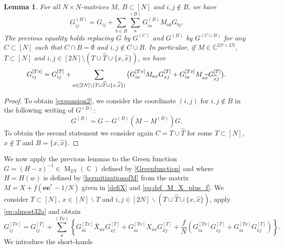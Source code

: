 \documentclass[10pt,a4paper]{amsart}
\DeclareMathOperator{\CC}{\mathbb{C}}
\DeclareMathOperator{\Mat}{\mathrm{M}}
\newcommand{\C}{\mathbb{C}}
\newtheorem{lemma}{Lemma}[section]
\numberwithin{equation}{section}
\newcommand*\barr[1]{\overline{#1}}
\newcommand*\bset[1]{[#1]}
\newcommand*\ubarr[1]{{\widehat{#1}}}
\newcommand{\nc}{\normalcolor}
\begin{document}
	\begin{lemma}
		For all $N \times N$-matrices $M$, $B \subset [N]$ and $i,j \notin B$, we have
		\begin{equation}\label{expansion2}
			G^{(B)}_{ij} = G_{ij} + \sum_{b \in B }\sum_{a}^{(B)}G^{(B)}_{ia}M_{ab}G_{bj}.
		\end{equation}
		The previous equality holds replacing $G$ by $G^{(C)}$ and $G^{(B)}$ by $G^{(C \cup B)}$ for any $C\subset [N]$ such that $C \cap B = \emptyset$ and $ i,j \notin C \cup B$. In particular, if $M \in \C^{2N\times 2N}$, $T \subset [N]$ and $i,j \in [2N]\setminus (T \cup \ubarr{T} \cup \{ x, \ubarr{x}\})$, 
		we have
		\begin{equation}\label{eq:almost32a}
			G^{\bset{Tx}}_{ij} = G_{ij}^{\bset{T}} + \sum_{ a \in [2N]\setminus (T \cup \ubarr{T} \cup \{ x, \ubarr{x}\})\nc} \big(  G_{ia}^{\bset{Tx}} M_{ax} G_{xj}^{\bset{T}} +  G_{ia}^{\bset{Tx}} M_{a\ubarr{x}} G_{\ubarr{x}j}^{\bset{T}}\big) .
		\end{equation}
		
	\end{lemma}
	\begin{proof}
		To obtain \eqref{expansion2}, we consider the coordinate $(i,j)$ for $i,j \notin B$ in the following writing of $G^{(B)}$:
		\begin{equation*}
			G^{(B)}= G - G^{(B)} \left(M - M^{(B)}\right) G.
		\end{equation*}
		To obtain the second statement we consider again  $C = T \cup \ubarr{T}$ for some $T \subset [N] $, $x \notin T$ and $B = \{x, \ubarr{x}\}$.
	\end{proof}
	We now apply the previous lemmas to the Green function $G= (H-z)^{-1} \in \Mat_{2N}(\CC)$ defined by \cref{Greenfunction} and where $H= H(w)$ is defined by \cref{hermitizationofM} from the matrix $M = X + f(\mathbf{e}\mathbf{e}^\ast - 1/N)$ given in \cref{defiX} and \cref{eq:def_M_X_plus_f}. We consider $T\subset[N]$, $x \in [N]\backslash T$ and $i,j \in [2N]\backslash ( T \cup \ubarr{T} \cup \{x,\ubarr{x}\} )$, apply \cref{eq:almost32a} and obtain
	\begin{equation}\label{eq:32a}
		G_{ij}^{\bset{Tx}} = G_{ij}^{\bset{T}} + \sum_{a}^{(Tx)}\left\{ G_{i\ubarr{a}}^{\bset{Tx}} \barr{X}_{ax}G_{xj}^{\bset{T}}+ G_{ia}^{\bset{Tx}} X_{ax} G_{\ubarr{x}j}^{\bset{T}} + \frac{f}{N} \left(G_{i \ubarr{a}}^{\bset{Tx}} G^{\bset{T}}_{xj} + G_{ia}^{\bset{Tx}} G_{\ubarr{x}j}^{\bset{T}} \right)\right\}.
	\end{equation}
	We introduce the short-hands 
\end{document}
